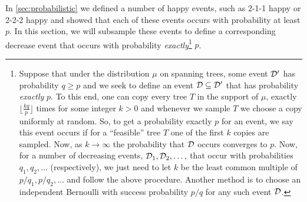 In  \cref{sec:probabilistic} we defined a number of happy events, such as 2-1-1 happy or 2-2-2 happy and showed that each of these events occurs with probability at least $p$. In this section, we will subsample these events to define a corresponding decrease  event that occurs with probability {\em exactly}\footnote{Suppose that under the distribution $\mu$ on spanning trees, some event ${\cal D}'$  has probability $q \ge p$ and we seek to define an event ${\cal D} \subseteq {\cal D}'$ that has probability {\em exactly} $p$.
To this end, one can copy every tree $T$ in the support of $\mu$, exactly $\lfloor \frac{kq}{p}\rfloor$ times for some integer $k>0$ and whenever we sample $T$ we choose a copy uniformly at random. So, to get a probability exactly $p$ for an event, we say this event occurs if for a ``feasible'' tree $T$ one of the first $k$ copies are sampled. Now, as $k\to\infty$ the probability that ${\cal D}$ occurs converges to $p$. Now, for a number of decreasing events, ${\cal D}_1,{\cal D}_2,\dots,$ that occur with probabilities $q_1,q_2,\dots$ (respectively), we just need to let $k$ be the least common multiple of $p/q_1, p/q_2,\dots$ and follow the above procedure. Another method is to choose an independent Bernoulli with success probability $p/q$ for any such event ${\cal D}$.} $p$.   


